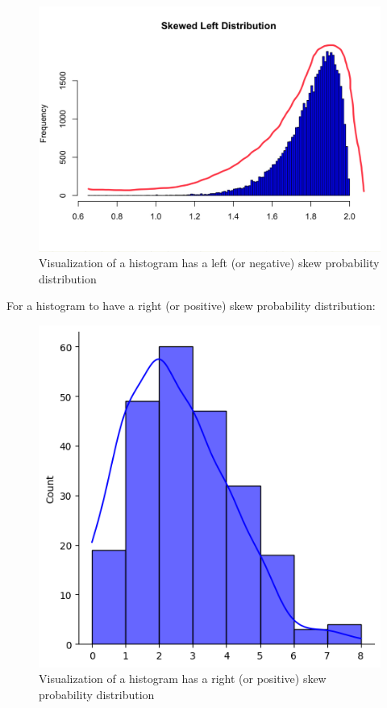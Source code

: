 \begin{figure}[H]
 \centering
 \includegraphics[scale=0.25]{Section1/img/HisL.jpg}
 \caption{Visualization of a histogram has a left (or negative) skew probability distribution}
\end{figure} 

\noindent
For a histogram to have a right (or positive) skew probability distribution:

\begin{figure}[H]
 \centering
 \includegraphics[scale=0.25]{Section1/img/HisR.jpg}
 \caption{Visualization of a histogram has a right (or positive) skew probability distribution}
\end{figure} 

